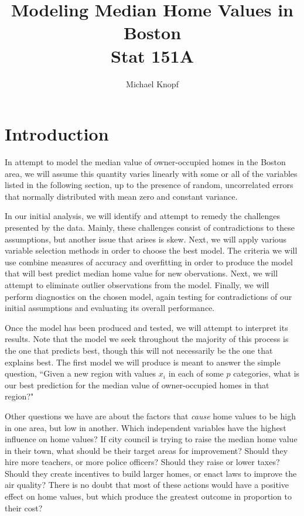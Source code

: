 \documentclass[12pt]{article}
\begin{document}
\title{Modeling Median Home Values in Boston \\ Stat 151A}
\author{Michael Knopf}
 
\maketitle

\section{Introduction}

In attempt to model the median value of owner-occupied homes in the Boston area, we will assume this quantity varies linearly with some or all of the variables listed in the following section, up to the presence of random, uncorrelated errors that normally distributed with mean zero and constant variance.

In our initial analysis, we will identify and attempt to remedy the challenges presented by the data.  Mainly, these challenges consist of contradictions to these assumptions, but another issue that arises is skew.  Next, we will apply various variable selection methods in order to choose the best model.  The criteria we will use combine measures of accuracy and overfitting in order to produce the model that will best predict median home value for new obervations.  Next, we will attempt to eliminate outlier observations from the model.  Finally, we will perform diagnostics on the chosen model, again testing for contradictions of our initial assumptions and evaluating its overall performance.

Once the model has been produced and tested, we will attempt to interpret its results.  Note that the model we seek throughout the majority of this process is the one that predicts best, though this will not necessarily be the one that explains best.  The first model we will produce is meant to answer the simple question, ``Given a new region with values $x_i$ in each of some $p$ categories, what is our best prediction for the median value of owner-occupied homes in that region?"

Other questions we have are about the factors that \emph{cause} home values to be high in one area, but low in another.  Which independent variables have the highest influence on home values?  If city council is trying to raise the median home value in their town, what should be their target areas for improvement?  Should they hire more teachers, or more police officers?  Should they raise or lower taxes?  Should they create incentives to build larger homes, or enact laws to improve the air quality?  There is no doubt that most of these actions would have a positive effect on home values, but which produce the greatest outcome in proportion to their cost?
\end{document}
